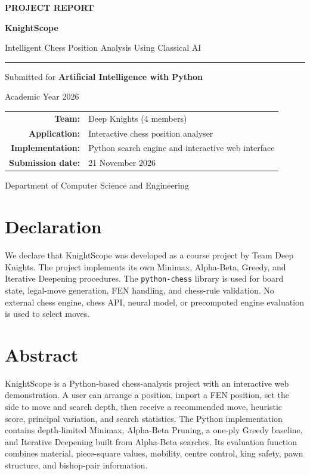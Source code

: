 \documentclass[12pt,a4paper]{report}
\begin{document}
\begin{titlepage}
\centering\vspace*{1.8cm}
{\LARGE\textbf{PROJECT REPORT}\par}\vspace{1.1cm}
{\Huge\textbf{KnightScope}\par}\vspace{0.35cm}
{\Large Intelligent Chess Position Analysis Using Classical AI\par}\vspace{1.2cm}
\rule{0.78\textwidth}{0.7pt}\par\vspace{0.7cm}
{\large Submitted for \textbf{Artificial Intelligence with Python}\par}\vspace{0.35cm}
{\large Academic Year 2026\par}\vspace{1.3cm}
\begin{tabular}{rl}
\textbf{Team:} & Deep Knights (4 members)\\
\textbf{Application:} & Interactive chess position analyser\\
\textbf{Implementation:} & Python search engine and interactive web interface\\
\textbf{Submission date:} & 21 November 2026
\end{tabular}
\vfill{\large Department of Computer Science and Engineering\par}
\end{titlepage}
\chapter*{Declaration}
We declare that KnightScope was developed as a course project by Team Deep Knights. The project implements its own Minimax, Alpha-Beta, Greedy, and Iterative Deepening procedures. The \texttt{python-chess} library is used for board state, legal-move generation, FEN handling, and chess-rule validation. No external chess engine, chess API, neural model, or precomputed engine evaluation is used to select moves.

\chapter*{Abstract}
KnightScope is a Python-based chess-analysis project with an interactive web demonstration. A user can arrange a position, import a FEN position, set the side to move and search depth, then receive a recommended move, heuristic score, principal variation, and search statistics. The Python implementation contains depth-limited Minimax, Alpha-Beta Pruning, a one-ply Greedy baseline, and Iterative Deepening built from Alpha-Beta searches. Its evaluation function combines material, piece-square values, mobility, centre control, king safety, pawn structure, and bishop-pair information.
\end{document}
